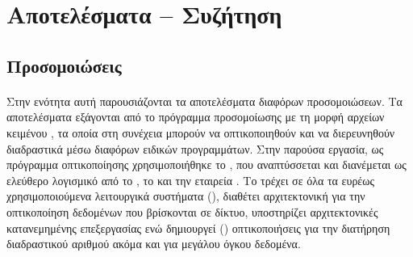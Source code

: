 \section{Αποτελέσματα -- Συζήτηση}

\subsection{Προσομοιώσεις}

\paragraph{} Στην ενότητα αυτή παρουσιάζονται τα αποτελέσματα διαφόρων προσομοιώσεων. Τα
αποτελέσματα εξάγονται από το πρόγραμμα προσομοίωσης με τη μορφή αρχείων κειμένου
, τα οποία στη συνέχεια μπορούν να οπτικοποιηθούν και να διερευνηθούν διαδραστικά
μέσω διαφόρων ειδικών προγραμμάτων. Στην παρούσα εργασία, ως πρόγραμμα οπτικοποίησης
χρησιμοποιήθηκε το , που αναπτύσσεται και διανέμεται ως ελεύθερο λογισμικό
από το , το  και την
εταιρεία . Το  τρέχει σε όλα τα ευρέως χρησιμοποιούμενα
λειτουργικά συστήματα (), διαθέτει αρχιτεκτονική
 για την οπτικοποίηση δεδομένων που βρίσκονται σε δίκτυο, υποστηρίζει
αρχιτεκτονικές κατανεμημένης επεξεργασίας ενώ δημιουργεί  ()
οπτικοποιήσεις για την διατήρηση διαδραστικού αριθμού  ακόμα και για μεγάλου
όγκου δεδομένα.


